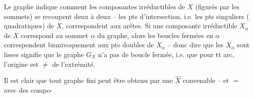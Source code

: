 Le graphe indique comment les composantes irréductibles de $X$ (figurés par les sommets) se recoupent deux à deux -- les pts d'intersection, i.e. les pts singuliers ( quadratiques) de $X$, correspondent aux arêtes. Si une composante irréductible $X_\alpha$ de $X$ correspond au sommet $\alpha$ du graphe, alors les boucles fermées en $\alpha$ correspondent biunivoquement aux pts doubles de $X_\alpha$ -- donc dire que les $X_\alpha$ sont lisses signifie que le graphe $G_X$ n'a pas de boucle fermée, i.e. que pour tt arc, l'origine est $\neq$ de l'extrémité.

Il est clair que tout graphe fini peut être obtenu   par une $\widehat X$ convenable -- et $=$ avec des compo-
